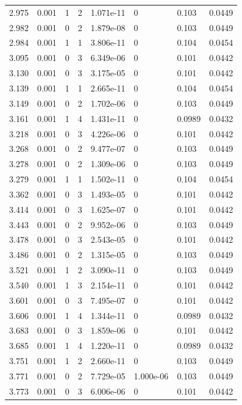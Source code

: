 \documentclass[preview]{standalone}
\begin{document}
{{{\begin{tabular}{L{1.2cm}C{1.2cm} C{0.3cm}C{0.5cm} C{1.4cm}C{1.4cm} C{1.4cm}C{1.4cm}}
  2.975  &  0.001  & 1     &  2 &  1.071e-11  & 0  & 0.103 &  0.0449   \\ 
  2.982  &  0.001  & 0     &  2 &  1.879e-08  & 0  & 0.103 &  0.0449   \\ 
  2.984  &  0.001  & 1     &  1 &  3.806e-11  & 0  & 0.104 &  0.0454   \\ 
  3.095  &  0.001  & 0     &  3 &  6.349e-06  & 0  & 0.101 &  0.0442   \\ 
  3.130  &  0.001  & 0     &  3 &  3.175e-05  & 0  & 0.101 &  0.0442   \\ 
  3.139  &  0.001  & 1     &  1 &  2.665e-11  & 0  & 0.104 &  0.0454   \\ 
  3.149  &  0.001  & 0     &  2 &  1.702e-06  & 0  & 0.103 &  0.0449   \\ 
  3.161  &  0.001  & 1     &  4 &  1.431e-11  & 0  & 0.0989 &  0.0432   \\ 
  3.218  &  0.001  & 0     &  3 &  4.226e-06  & 0  & 0.101 &  0.0442   \\ 
  3.268  &  0.001  & 0     &  2 &  9.477e-07  & 0  & 0.103 &  0.0449   \\ 
  3.278  &  0.001  & 0     &  2 &  1.309e-06  & 0  & 0.103 &  0.0449   \\ 
  3.279  &  0.001  & 1     &  1 &  1.502e-11  & 0  & 0.104 &  0.0454   \\ 
  3.362  &  0.001  & 0     &  3 &  1.493e-05  & 0  & 0.101 &  0.0442   \\ 
  3.414  &  0.001  & 0     &  3 &  1.625e-07  & 0  & 0.101 &  0.0442   \\ 
  3.443  &  0.001  & 0     &  2 &  9.952e-06  & 0  & 0.103 &  0.0449   \\ 
  3.478  &  0.001  & 0     &  3 &  2.543e-05  & 0  & 0.101 &  0.0442   \\ 
  3.486  &  0.001  & 0     &  2 &  1.315e-05  & 0  & 0.103 &  0.0449   \\ 
  3.521  &  0.001  & 1     &  2 &  3.090e-11  & 0  & 0.103 &  0.0449   \\ 
  3.540  &  0.001  & 1     &  3 &  2.154e-11  & 0  & 0.101 &  0.0442   \\ 
  3.601  &  0.001  & 0     &  3 &  7.495e-07  & 0  & 0.101 &  0.0442   \\ 
  3.606  &  0.001  & 1     &  4 &  1.344e-11  & 0  & 0.0989 &  0.0432   \\ 
  3.683  &  0.001  & 0     &  3 &  1.859e-06  & 0  & 0.101 &  0.0442   \\ 
  3.685  &  0.001  & 1     &  4 &  1.220e-11  & 0  & 0.0989 &  0.0432   \\ 
  3.751  &  0.001  & 1     &  2 &  2.660e-11  & 0  & 0.103 &  0.0449   \\ 
  3.771  &  0.001  & 0     &  2 &  7.729e-05  & 1.000e-06  & 0.103 &  0.0449   \\ 
  3.773  &  0.001  & 0     &  3 &  6.006e-06  & 0  & 0.101 &  0.0442   \\ 
\hline 
\end{tabular} 

}}}
\end{document}
